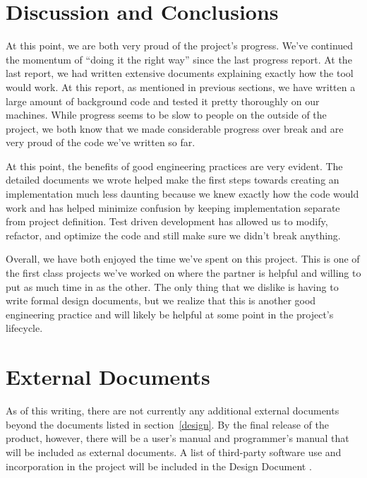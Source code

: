\documentclass[letterpaper,12pt]{article}
\begin{document}
\newpage



\section{Discussion and Conclusions} \label{discussion}
At this point, we are both very proud of the project's progress.  We've
continued the momentum of ``doing it the right way'' since the last progress
report.  At the last report, we had written extensive documents explaining
exactly how the tool would work.  At this report, as mentioned in previous
sections, we have written a large amount of background code and tested it pretty
thoroughly on our machines.  While progress seems to be slow to people on the
outside of the project, we both know that we made considerable progress over
break and are very proud of the code we've written so far.

At this point, the benefits of good engineering practices are very evident.  The
detailed documents we wrote helped make the first steps towards creating an
implementation much less daunting because we knew exactly how the code would
work and has helped minimize confusion by keeping implementation separate from
project definition.  Test driven development has allowed us to modify, refactor,
and optimize the code and still make sure we didn't break anything.  

Overall, we have both enjoyed the time we've spent on this project.  This is one
of the first class projects we've worked on where the partner is helpful and
willing to put as much time in as the other.  The only thing that we dislike is
having to write formal design documents, but we realize that this is another
good engineering practice and will likely be helpful at some point in the
project's lifecycle.  

\newpage



\section{External Documents} \label{documents}
As of this writing, there are not currently any additional external documents
beyond the documents listed in section~\ref{design}.  By the final release of
the product, however, there will be a user's manual and programmer's manual that
will be included as external documents.  A list of third-party software use and
incorporation in the project will be included in the Design Document
\cite{Design}.
\end{document}
